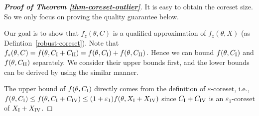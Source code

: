 \begin{proof}[\textbf{Proof of Theorem \ref{thm-coreset-outlier}}]
It is easy to obtain the coreset size. So we only focus on proving the quality guarantee below. 

Our goal is to show that $ f_{z}(\theta,C)$ is a qualified approximation of $ f_{z}(\theta,X)$ (as Defintion~\ref{robust-coreset}).  
Note that $ f_{z}(\theta,C)=f(\theta,C_\mathrm{\Rnum{1}}+ C_\mathrm{\Rnum{2}})=f(\theta,C_\mathrm{\Rnum{1}})+f(\theta,C_\mathrm{\Rnum{2}}) $. Hence we can bound $ f(\theta,C_\mathrm{\Rnum{1}}) $ and $ f(\theta,C_\mathrm{\Rnum{2}}) $ separately. We consider their upper bounds first, and the lower bounds can be derived by using the similar manner. 


The upper bound of $ f(\theta,C_\mathrm{\Rnum{1}}) $ directly comes from the definition of $\varepsilon$-coreset, i.e., $ f(\theta,C_\mathrm{\Rnum{1}})\leq f(\theta,C_\mathrm{\Rnum{1}}+C_\mathrm{\Rnum{4}})\leq (1+\varepsilon_1) f(\theta,X_\mathrm{\Rnum{1}}+X_\mathrm{\Rnum{4}}) $ since $ C_\mathrm{\Rnum{1}}+C_\mathrm{\Rnum{4}} $ is an $ \varepsilon_1 $-coreset of $ X_\mathrm{\Rnum{1}}+X_\mathrm{\Rnum{4}} $.


\end{proof}
